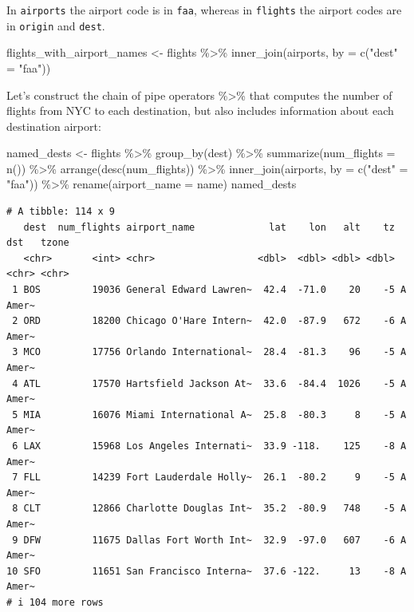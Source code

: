 \documentclass[
  letterpaper,
  DIV=11,
  numbers=noendperiod]{scrartcl}
\newenvironment{Shaded}{\begin{snugshade}}{\end{snugshade}}
\newcommand{\AttributeTok}[1]{\textcolor[rgb]{0.40,0.45,0.13}{#1}}
\newcommand{\FunctionTok}[1]{\textcolor[rgb]{0.28,0.35,0.67}{#1}}
\newcommand{\NormalTok}[1]{\textcolor[rgb]{0.00,0.23,0.31}{#1}}
\newcommand{\OtherTok}[1]{\textcolor[rgb]{0.00,0.23,0.31}{#1}}
\newcommand{\SpecialCharTok}[1]{\textcolor[rgb]{0.37,0.37,0.37}{#1}}
\newcommand{\StringTok}[1]{\textcolor[rgb]{0.13,0.47,0.30}{#1}}
\begin{document}
In \texttt{airports} the airport code is in \texttt{faa}, whereas in
\texttt{flights} the airport codes are in \texttt{origin} and
\texttt{dest}.

\begin{Shaded}
\begin{Highlighting}[]
\NormalTok{flights\_with\_airport\_names }\OtherTok{\textless{}{-}}\NormalTok{ flights }\SpecialCharTok{\%\textgreater{}\%} 
  \FunctionTok{inner\_join}\NormalTok{(airports, }\AttributeTok{by =} \FunctionTok{c}\NormalTok{(}\StringTok{"dest"} \OtherTok{=} \StringTok{"faa"}\NormalTok{))}
\end{Highlighting}
\end{Shaded}

Let's construct the chain of pipe operators \%\textgreater\% that
computes the number of flights from NYC to each destination, but also
includes information about each destination airport:

\begin{Shaded}
\begin{Highlighting}[]
\NormalTok{named\_dests }\OtherTok{\textless{}{-}}\NormalTok{ flights }\SpecialCharTok{\%\textgreater{}\%}
  \FunctionTok{group\_by}\NormalTok{(dest) }\SpecialCharTok{\%\textgreater{}\%}
  \FunctionTok{summarize}\NormalTok{(}\AttributeTok{num\_flights =} \FunctionTok{n}\NormalTok{()) }\SpecialCharTok{\%\textgreater{}\%}
  \FunctionTok{arrange}\NormalTok{(}\FunctionTok{desc}\NormalTok{(num\_flights)) }\SpecialCharTok{\%\textgreater{}\%}
  \FunctionTok{inner\_join}\NormalTok{(airports, }\AttributeTok{by =} \FunctionTok{c}\NormalTok{(}\StringTok{"dest"} \OtherTok{=} \StringTok{"faa"}\NormalTok{)) }\SpecialCharTok{\%\textgreater{}\%}
  \FunctionTok{rename}\NormalTok{(}\AttributeTok{airport\_name =}\NormalTok{ name)}
\NormalTok{named\_dests}
\end{Highlighting}
\end{Shaded}

\begin{verbatim}
# A tibble: 114 x 9
   dest  num_flights airport_name             lat    lon   alt    tz dst   tzone
   <chr>       <int> <chr>                  <dbl>  <dbl> <dbl> <dbl> <chr> <chr>
 1 BOS         19036 General Edward Lawren~  42.4  -71.0    20    -5 A     Amer~
 2 ORD         18200 Chicago O'Hare Intern~  42.0  -87.9   672    -6 A     Amer~
 3 MCO         17756 Orlando International~  28.4  -81.3    96    -5 A     Amer~
 4 ATL         17570 Hartsfield Jackson At~  33.6  -84.4  1026    -5 A     Amer~
 5 MIA         16076 Miami International A~  25.8  -80.3     8    -5 A     Amer~
 6 LAX         15968 Los Angeles Internati~  33.9 -118.    125    -8 A     Amer~
 7 FLL         14239 Fort Lauderdale Holly~  26.1  -80.2     9    -5 A     Amer~
 8 CLT         12866 Charlotte Douglas Int~  35.2  -80.9   748    -5 A     Amer~
 9 DFW         11675 Dallas Fort Worth Int~  32.9  -97.0   607    -6 A     Amer~
10 SFO         11651 San Francisco Interna~  37.6 -122.     13    -8 A     Amer~
# i 104 more rows
\end{verbatim}
\end{document}
